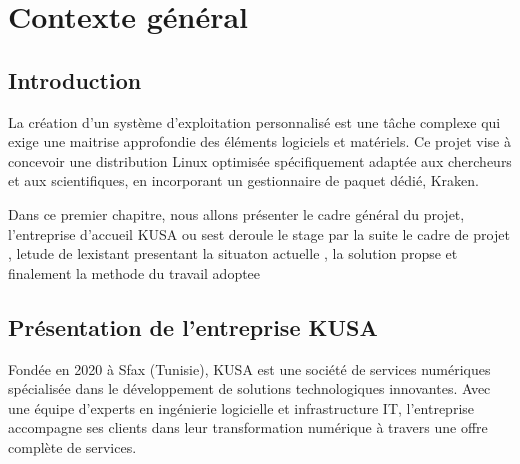 \chapter{Contexte général} 
\minitoc
\clearpage
\label{sec:organisme}














\section{Introduction}
La création d'un système d'exploitation personnalisé  est une tâche complexe qui exige une maitrise approfondie des éléments logiciels et matériels. Ce projet vise à concevoir une distribution Linux optimisée spécifiquement adaptée aux chercheurs et aux scientifiques, en incorporant un gestionnaire de paquet dédié, Kraken.

Dans ce premier chapitre, nous allons présenter le cadre général du projet, l'entreprise d'accueil KUSA  ou  sest deroule le stage par la suite le cadre de projet , letude de lexistant presentant la situaton actuelle , la solution propse et finalement la methode du travail adoptee







\section{Présentation de l'entreprise KUSA}
\label{sec:kusa}

Fondée en 2020 à Sfax (Tunisie), KUSA est une société de services numériques spécialisée dans le développement de solutions technologiques innovantes. Avec une équipe d'experts en ingénierie logicielle et infrastructure IT, l'entreprise accompagne ses clients dans leur transformation numérique à travers une offre complète de services.

